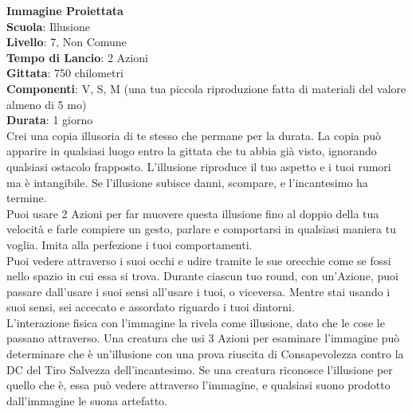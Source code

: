 \begin{multicols}{2}
\medskip\textbf{Immagine Proiettata}\\
\textbf{Scuola}: Illusione\\
\textbf{Livello}: 7, Non Comune\\
\textbf{Tempo di Lancio}: 2 Azioni\\
\textbf{Gittata}: 750 chilometri\\
\textbf{Componenti}: V, S, M (una tua piccola riproduzione fatta di materiali del valore almeno di 5 mo)\\
\textbf{Durata}: 1 giorno\\
Crei una copia illusoria di te stesso che permane per la durata. La copia può apparire in qualsiasi luogo entro la gittata che tu abbia già visto, ignorando qualsiasi ostacolo frapposto. L'illusione riproduce il tuo aspetto e i tuoi rumori ma è intangibile. Se l'illusione subisce danni, scompare, e l'incantesimo ha termine.\\
Puoi usare 2 Azioni per far muovere questa illusione fino al doppio della tua velocità e farle compiere un gesto, parlare e comportarsi in qualsiasi maniera tu voglia. Imita alla perfezione i tuoi comportamenti.\\
Puoi vedere attraverso i suoi occhi e udire tramite le sue orecchie come se fossi nello spazio in cui essa si trova. Durante ciascun tuo round, con un'Azione, puoi passare dall'usare i suoi sensi all'usare i tuoi, o viceversa. Mentre stai usando i suoi sensi, sei accecato e assordato riguardo i tuoi dintorni.\\
L'interazione fisica con l'immagine la rivela come illusione, dato che le cose le passano attraverso. Una creatura che usi 3 Azioni per esaminare l'immagine può determinare che è un'illusione con una prova riuscita di Consapevolezza contro la DC del Tiro Salvezza dell'incantesimo. Se una creatura riconosce l'illusione per quello che è, essa può vedere attraverso l'immagine, e qualsiasi suono prodotto dall'immagine le suona artefatto.


\end{multicols}

